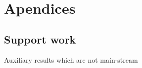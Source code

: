 \documentclass[
  oneside,
  11pt, a4paper,
  footinclude=true,
  headinclude=true,
  cleardoublepage=empty
]{scrbook}
\begin{document}
\cleardoublepage

%




\printindex
	
	\appendix
	\renewcommand\chaptername{Appendix}


\part{Apendices}

\chapter{Support work}
	Auxiliary results which are not main-stream
	
\end{document}
